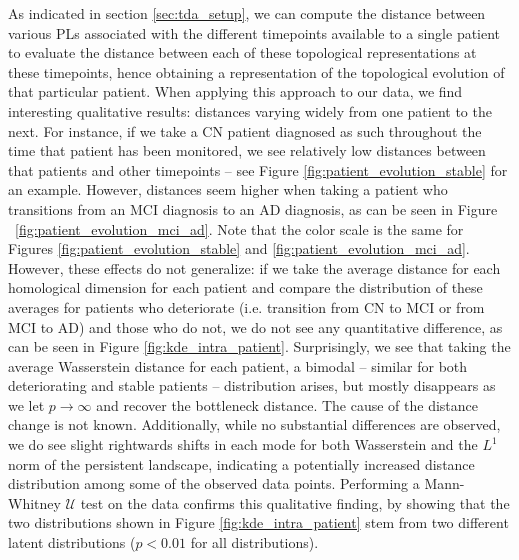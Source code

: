 \documentclass{article}
\begin{document}
As indicated in section \ref{sec:tda_setup}, we can compute the distance between
various PLs associated with the different timepoints available to a single patient
to evaluate the distance between each of these topological representations at
these timepoints, hence obtaining a representation of the topological evolution
of that particular patient. When applying this approach to our data, we find
interesting qualitative results: distances varying widely from one patient to
the next. For instance, if we take a CN patient diagnosed as such throughout the
time that patient has been monitored, we see relatively low distances between
that patients and other timepoints -- see Figure
\ref{fig:patient_evolution_stable} for an example. However, distances seem
higher when taking a patient who transitions from an MCI diagnosis to an AD
diagnosis, as can be seen in Figure ~\ref{fig:patient_evolution_mci_ad}. Note
that the color scale is the same for Figures \ref{fig:patient_evolution_stable}
and \ref{fig:patient_evolution_mci_ad}. However, these effects do not
generalize: if we take the average distance for each homological dimension for
each patient and compare the distribution of these averages for patients who
deteriorate (i.e. transition from CN to MCI or from MCI to AD) and those who do
not, we do not see any quantitative difference, as can be seen in Figure
\ref{fig:kde_intra_patient}. Surprisingly, we see that taking the average
Wasserstein distance for each patient, a bimodal -- similar for both
deteriorating and stable patients -- distribution arises, but mostly disappears as we
let $p\to\infty$ and recover the bottleneck distance. The cause of the distance
change is not known. Additionally, while no substantial differences are
observed, we do see slight rightwards shifts in each mode for both Wasserstein
and the $L^1$ norm of the persistent landscape, indicating a potentially
increased distance distribution among some of the observed data points.
Performing a Mann-Whitney $\mathcal{U}$ test on the data confirms this
qualitative finding, by showing that the two distributions shown in Figure
\ref{fig:kde_intra_patient} stem from two different latent distributions ($p<0.01$ for all distributions).
\end{document}
